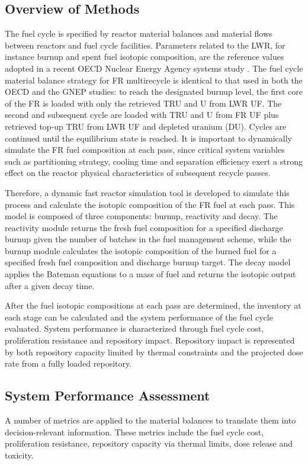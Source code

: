 \subsection{Overview of Methods}
\label{ses_sec:method_overview}
The fuel cycle is specified by reactor material balances and material
flows between reactors and fuel cycle facilities.  Parameters related to
the LWR, for instance burnup and spent fuel isotopic composition, are
the reference values adopted in a recent OECD Nuclear Energy Agency
systems study \cite{NEA-5990}.  The fuel cycle material balance strategy for FR
multirecycle is identical to that used in both the OECD and the GNEP
studies: to reach the designated burnup level, the first core of the FR
is loaded with only the retrieved TRU and U from LWR UF. The second and
subsequent cycle are loaded with TRU and U from FR UF plus retrieved
top-up TRU from LWR UF and depleted uranium (DU).  Cycles are continued
until the equilibrium state is reached.  It is important to dynamically
simulate the FR fuel composition at each pass, since critical system
variables such as partitioning strategy, cooling time and separation
efficiency exert a strong effect on the reactor physical characteristics
of subsequent recycle passes. 

Therefore, a dynamic fast reactor simulation tool is developed to
simulate this process and calculate the isotopic composition of the FR
fuel at each pass.  This model is composed of three components: burnup,
reactivity and decay.  The reactivity module returns the fresh fuel
composition for a specified discharge burnup given the number of batches
in the fuel management scheme, while the burnup module calculates the
isotopic composition of the burned fuel for a specified fresh fuel
composition and discharge burnup target.  The decay model applies the
Bateman equations to a mass of fuel and returns the isotopic output
after a given decay time.  

After the fuel isotopic compositions at each pass are determined, the
inventory at each stage can be calculated and the system performance of
the fuel cycle evaluated.  System performance is characterized through
fuel cycle cost, proliferation resistance and repository impact. 
Repository impact is represented by both repository capacity limited by
thermal constraints and the projected dose rate from a fully loaded
repository.  



\subsection{System Performance Assessment}
\label{ses_sec:spa}
A number of metrics are applied to the material balances to translate
them into decision-relevant information.  These metrics include the fuel
cycle cost, proliferation resistance, repository capacity via thermal
limits, dose release and toxicity.

